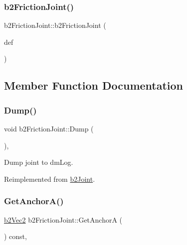 \subsubsection{\texorpdfstring{b2FrictionJoint()}{b2FrictionJoint()}}
{\footnotesize\ttfamily b2\+Friction\+Joint\+::b2\+Friction\+Joint (\begin{DoxyParamCaption}\item[{const \mbox{\hyperlink{structb2_friction_joint_def}{b2\+Friction\+Joint\+Def}} $\ast$}]{def }\end{DoxyParamCaption})\hspace{0.3cm}{\ttfamily [protected]}}



\subsection{Member Function Documentation}
\mbox{\label{classb2_friction_joint_a934a3ce5bda09bc07111c1dd4e192406}} 
\subsubsection{\texorpdfstring{Dump()}{Dump()}}
{\footnotesize\ttfamily void b2\+Friction\+Joint\+::\+Dump (\begin{DoxyParamCaption}{ }\end{DoxyParamCaption})\hspace{0.3cm}{\ttfamily [override]}, {\ttfamily [virtual]}}



Dump joint to dm\+Log. 



Reimplemented from \mbox{\hyperlink{classb2_joint_abd35e7316017ad9a40d5dbf9b5ba3f36}{b2\+Joint}}.

\mbox{\label{classb2_friction_joint_a8e0bf2e9eba24f326d060789fedc7278}} 
\subsubsection{\texorpdfstring{GetAnchorA()}{GetAnchorA()}}
{\footnotesize\ttfamily \mbox{\hyperlink{structb2_vec2}{b2\+Vec2}} b2\+Friction\+Joint\+::\+Get\+AnchorA (\begin{DoxyParamCaption}{ }\end{DoxyParamCaption}) const\hspace{0.3cm}{\ttfamily [override]}, {\ttfamily [virtual]}}



